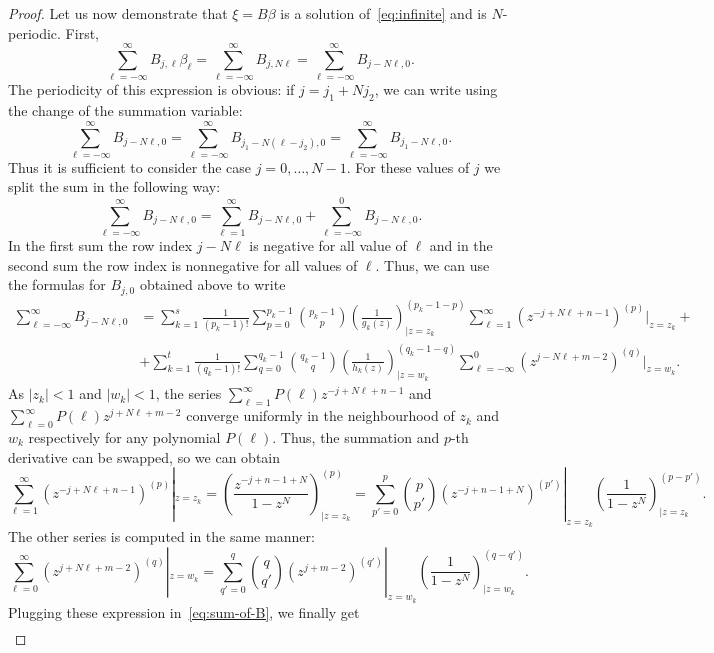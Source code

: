 \documentclass{article}
\begin{document}
\begin{proof}
	Let us now demonstrate that $\xi = B\beta$ is a solution of~\eqref{eq:infinite} and is $N$-periodic.
	First,
	\[
	\sum_{\ell=-\infty}^{\infty} B_{j,\ell} \beta_{\ell}
	=
	\sum_{\ell=-\infty}^{\infty}B_{j, N\ell}
	= 
	\sum_{\ell=-\infty}^{\infty}B_{j-N\ell, 0}.
	\]
	The periodicity of this expression is obvious: if $j = j_1 + Nj_2$, we can write using the change of the summation variable:
	\[
	\sum_{\ell=-\infty}^{\infty}B_{j-N\ell, 0}
	=
	\sum_{\ell=-\infty}^{\infty}B_{j_1-N(\ell-j_2), 0}
	=
	\sum_{\ell=-\infty}^{\infty}B_{j_1-N\ell, 0}.
	\]
	Thus it is sufficient to consider the case $j = 0,\dots, N-1$. 
	For these values of $j$ we split the sum in the following way:
	\[
	\sum_{\ell=-\infty}^{\infty}B_{j-N\ell, 0} 
	=
	\sum_{\ell=1}^{\infty}B_{j-N\ell, 0}
	+
	\sum_{\ell=-\infty}^{0}B_{j-N\ell, 0}.
	\]
	In the first sum the row index $j - N\ell$ is negative for all value of $\ell$ and in the second sum the row index is nonnegative for all values of $\ell$.
	Thus, we can use the formulas for $B_{j,0}$ obtained above to write
	\begin{align}
	\sum_{\ell=-\infty}^{\infty}B_{j-N\ell, 0} 
	&=
	\sum_{k=1}^s\frac{1}{(p_k - 1)!}\sum_{p=0}^{p_k-1}\binom{p_k-1}{p}
	\left(\frac{1}{g_k(z)}\right)^{(p_k-1-p)}_{\big|{z=z_k}}
	\sum_{\ell=1}^{\infty}
	(z^{-j+N\ell+n-1})^{(p)}|_{z=z_k}  \nonumber
		+\\&+
	\sum_{k=1}^t\frac{1}{(q_k - 1)!}\sum_{q=0}^{q_k-1}\binom{q_k-1}{q}
	\left(\frac{1}{h_k(z)}\right)^{(q_k-1-q)}_{\big|{z=w_k}}
	\sum_{\ell=-\infty}^{0}
	(z^{j-N\ell+m-2})^{(q)}|_{z=w_k}. \label{eq:sum-of-B}
	\end{align}
    As $|z_k| < 1$ and $|w_k| < 1$, the series
    $
    \sum_{\ell=1}^{\infty}
	P(\ell)z^{-j+N\ell+n-1}
	$
    and 
    $
    \sum_{\ell=0}^{\infty}
	P(\ell)z^{j+N\ell+m-2}
    $
	converge uniformly in the neighbourhood of $z_k$ and $w_k$ respectively for any polynomial $P(\ell)$.
	Thus, the summation and $p$-th derivative can be swapped, so we can obtain
	\[
	\sum_{\ell=1}^{\infty}
	(z^{-j+N\ell+n-1})^{(p)}|_{z=z_k}
	=
    \left(\frac{z^{-j+n-1+N}}{1-z^{N}}\right)^{(p)}_{\big|{z=z_k}}
    =
	\sum_{p'=0}^p\binom{p}{p'}(z^{-j+n-1+N})^{(p')}|_{z=z_k} \left(\frac{1}{1-z^{N}}\right)^{(p-p')}_{\big|{z=z_k}}.
	\]
	The other series is computed in the same manner:	
	\[
	\sum_{\ell=0}^{\infty}
	(z^{j+N\ell+m-2})^{(q)}|_{z=w_k}
	=
	\sum_{q'=0}^q\binom{q}{q'}(z^{j+m-2})^{(q')}|_{z=w_k} \left(\frac{1}{1-z^{N}}\right)^{(q-q')}_{\big|{z=w_k}}.
	\]
	Plugging these expression in~\eqref{eq:sum-of-B}, we finally get
	\begin{align*}

\end{align*}
\end{proof}
\end{document}
